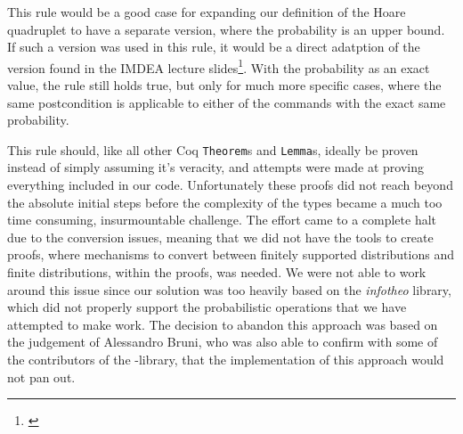 This rule would be a good case for expanding our definition of the Hoare quadruplet to have a separate version, where the probability is an upper bound. If such a version was used in this rule, it would be a direct adatption of the version found in the IMDEA lecture slides\footnote{\textcite{HoareSlides}}. With the probability as an exact value, the rule still holds true, but only for much more specific cases, where the same postcondition is applicable to either of the commands with the exact same probability.



This rule should, like all other Coq \texttt{Theorem}s and \texttt{Lemma}s, ideally be proven instead of simply assuming it's veracity, and attempts were made at proving everything included in our code. Unfortunately these proofs did not reach beyond the absolute initial steps before the complexity of the types became a much too time consuming, insurmountable challenge.
The effort came to a complete halt due to the conversion issues, meaning that we did not have the tools to create proofs, where mechanisms to convert between finitely supported distributions and finite distributions, within the proofs, was needed.
We were not able to work around this issue since our solution was too heavily based on the \textit{infotheo} library, which did not properly support the probabilistic operations that we have attempted to make work. The decision to abandon this approach was based on the judgement of Alessandro Bruni, who was also able to confirm with some of the contributors of the -library, that the implementation of this approach would not pan out.

